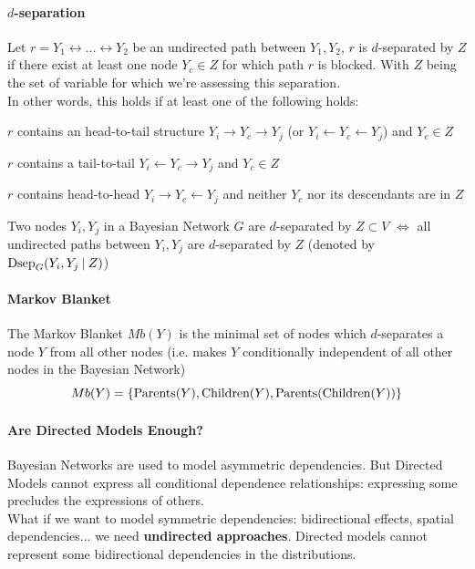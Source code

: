 \documentclass[10pt]{report}
\begin{document}
\paragraph{$d$-separation} Let $r = Y_1\leftrightarrow\ldots\leftrightarrow Y_2$ be an undirected path between $Y_1,Y_2$, $r$ is $d$-separated by $Z$ if there exist at least one node $Y_c\in Z$ for which path $r$ is blocked. With $Z$ being the set of variable for which we're assessing this separation.\\
In other words, this holds if at least one of the following holds:\begin{list}{}{}
	\item $r$ contains an head-to-tail structure $Y_i\rightarrow Y_c\rightarrow Y_j$ (or $Y_i\leftarrow Y_c\leftarrow Y_j$) and $Y_c \in Z$
	\item $r$ contains a tail-to-tail $Y_i\leftarrow Y_c\rightarrow Y_j$ and $Y_c \in Z$
	\item $r$ contains head-to-head $Y_i\rightarrow Y_c\leftarrow Y_j$ and neither $Y_c$ nor its descendants are in $Z$
\end{list}
Two nodes $Y_i,Y_j$ in a Bayesian Network $G$ are $d$-separated by $Z\subset V$ $\Leftrightarrow$ all undirected paths between $Y_i,Y_j$ are $d$-separated by $Z$ (denoted by $\hbox{Dsep}_G(Y_i,Y_j\:|\:Z)$)
\paragraph{Markov Blanket} The Markov Blanket $Mb(Y)$ is the minimal set of nodes which $d$-separates a node $Y$ from all other nodes (i.e. makes $Y$ conditionally independent of all other nodes in the Bayesian Network)
$$Mb(Y) = \{\hbox{Parents}(Y), \hbox{Children}(Y), \hbox{Parents}(\hbox{Children}(Y))\}$$
\paragraph{Are Directed Models Enough?} Bayesian Networks are used to model asymmetric dependencies. But Directed Models cannot express all conditional dependence relationships: expressing some precludes the expressions of others.\\
What if we want to model symmetric dependencies: bidirectional effects, spatial dependencies... we need \textbf{undirected approaches}. Directed models cannot represent some bidirectional dependencies in the distributions.
\end{document}
